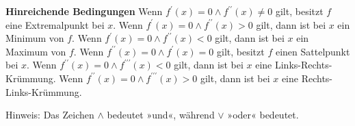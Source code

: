 \documentclass[12pt]{article}
\begin{document}
				\begin{tcolorbox}[boxsep=0pt,top=.75cm,left=1cm,right=1cm, bottom=.65cm,arc=0pt,auto outer arc,colback=white,colframe=black, enlarge top by=.45cm, enlarge bottom by=.25cm]
					\textbf{Hinreichende Bedingungen}\newline\newline
					Wenn \colorbox{teal!30}{$f^{\prime}(x)=0\land f^{\prime\prime}(x)\neq 0$} gilt, besitzt $f$ eine \colorbox{teal!30}{Extremalpunkt} bei $x$.\newline\newline
					Wenn \colorbox{yellow!30}{$f^{\prime}(x)=0\land f^{\prime\prime}(x)>0$} gilt, dann ist bei $x$ ein \colorbox{yellow!30}{Minimum} von $f$.\newline\newline
					Wenn \colorbox{green!30}{$f^{\prime}(x)=0\land f^{\prime\prime}(x)<0$} gilt, dann ist bei $x$ ein \colorbox{green!30}{Maximum} von $f$.\newline\newline\newline
					Wenn \colorbox{violet!30}{$f^{\prime\prime}(x)=0\land f^{\prime}(x)=0$} gilt, besitzt $f$ einen \colorbox{violet!30}{Sattelpunkt} bei $x$.\newline\newline
					Wenn \colorbox{purple!30}{$f^{\prime\prime}(x)=0\land f^{\prime\prime\prime}(x)<0$} gilt, dann ist bei $x$ eine \colorbox{purple!30}{Links-Rechts-Krümmung.}\newline\newline
					Wenn \colorbox{orange!30}{$f^{\prime\prime}(x)=0\land f^{\prime\prime\prime}(x)>0$} gilt, dann ist bei $x$ eine \colorbox{orange!30}{Rechts-Links-Krümmung.}
				\end{tcolorbox}
				\noindent Hinweis: Das Zeichen $\land$ bedeutet »und«, während $\lor$ »oder« bedeutet.
\end{document}
